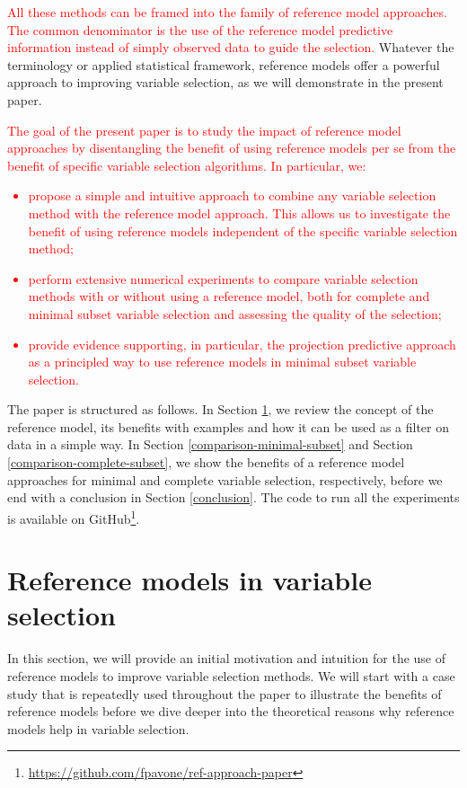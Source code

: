 \documentclass[a4]{article}
\let\rmarkdownfootnote\footnote%
\def\footnote{\protect\rmarkdownfootnote}
\theoremstyle{definition}
\newcommand{\fede}[1]{\textcolor{red}{#1}}
\begin{document}
\fede{All these methods can be framed into the family of reference model approaches. 
The common denominator is the use of the reference model predictive information 
instead of simply observed data to guide the selection.}
Whatever the terminology or applied statistical framework, reference
models offer a powerful approach to improving variable selection, as we
will demonstrate in the present paper. 

\fede{The goal of the present paper is to study the impact of reference model approaches by disentangling the benefit of using reference models per se from the benefit of specific variable selection algorithms. In particular, we:
\begin{itemize}
	\item propose a simple and intuitive approach to combine any variable selection method with the reference model approach. This allows us to investigate the benefit of using reference models independent of the specific variable selection method;
	\item perform extensive numerical experiments to compare variable selection methods with or without using a reference model, both for complete and minimal subset variable selection and assessing the quality of the selection;
	\item provide evidence supporting, in particular, the projection predictive approach as a principled way to use reference models in minimal subset variable selection.
\end{itemize}}

The paper is structured as follows. In Section
\ref{ref-intro}, we review the concept of the reference
model, its benefits with examples and how it can be used as a filter
on data in a simple way. In Section \ref{comparison-minimal-subset} and 
Section \ref{comparison-complete-subset}, we show the
benefits of a reference model approaches for minimal and complete 
variable selection, respectively, before we end with a conclusion in Section \ref{conclusion}.
The code to run all
the experiments is available on GitHub\footnote{\url{https://github.com/fpavone/ref-approach-paper}}.

\section{Reference models in variable selection}
\label{ref-intro}

In this section, we will provide an initial motivation and intuition 
for the use of reference models to improve variable selection methods.
We will start with a case study that is repeatedly used throughout
the paper to illustrate the benefits of reference models before we dive deeper
into the theoretical reasons why reference models help in variable selection.
\end{document}
